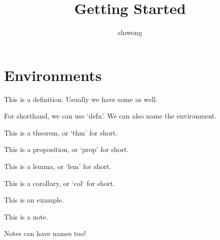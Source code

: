 \documentclass[10pt,a4paper]{article}
\title{
	Getting Started
}
\author{slnwong}
\date{\vspace{-5ex}}
\begin{document}
\maketitle
\tableofcontents
\clearpage

\section{Environments}
\begin{definition}
	This is a definition. Usually we have some  as well.
\end{definition}

\begin{defn}[Defn]
	For shorthand, we can use `defn'. We can also name the environment.
\end{defn}

\begin{theorem}
	This is a theorem, or `thm' for short.
\end{theorem}

\begin{proposition}
	This is a proposition, or `prop' for short.
\end{proposition}

\begin{lemma}
	This is a lemma, or `lem' for short.
\end{lemma}

\begin{corollary}
	This is a corollary, or `col` for short.
\end{corollary}

\begin{example}
	This is an example.
\end{example}

\begin{note}
	This is a note.
\end{note}

\begin{note}
	Notes can have names too!
\end{note}
\end{document}
